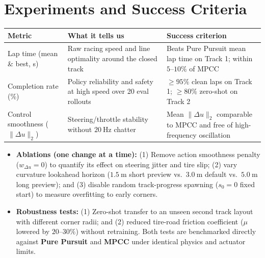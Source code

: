 \documentclass[11pt]{article}
\begin{document}
\section{Experiments and Success Criteria}
\begin{center}
\begin{tabular}{l p{} p{}}
\toprule
Metric & What it tells us & Success criterion\\
\midrule
Lap time (mean \& best, s) & Raw racing speed and line optimality around the closed track & Beats Pure Pursuit mean lap time on Track 1; within $5\text{--}10\%$ of MPCC\\
Completion rate (\%) & Policy reliability and safety at high speed over 20 eval rollouts & $\ge 95\%$ clean laps on Track 1; $\ge 80\%$ zero-shot on Track 2\\
Control smoothness ($\|\Delta u\|_2$) & Steering/throttle stability without $20~\text{Hz}$ chatter & Mean $\|\Delta u\|_2$ comparable to MPCC and free of high-frequency oscillation\\
\bottomrule
\end{tabular}
\end{center}
\begin{itemize}[leftmargin=1.5em, itemsep=0.25em]
    \item \textbf{Ablations (one change at a time):} (1) Remove action smoothness penalty ($w_{\Delta u} = 0$) to quantify its effect on steering jitter and tire slip; (2) vary curvature lookahead horizon ($1.5~\text{m}$ short preview vs.\ $3.0~\text{m}$ default vs.\ $5.0~\text{m}$ long preview); and (3) disable random track-progress spawning ($s_0 = 0$ fixed start) to measure overfitting to early corners.
    \item \textbf{Robustness tests:} (1) Zero-shot transfer to an unseen second track layout with different corner radii; and (2) reduced tire-road friction coefficient ($\mu$ lowered by $20\text{--}30\%$) without retraining. Both tests are benchmarked directly against \textbf{Pure Pursuit} and \textbf{MPCC} under identical physics and actuator limits.
\end{itemize}
\end{document}
